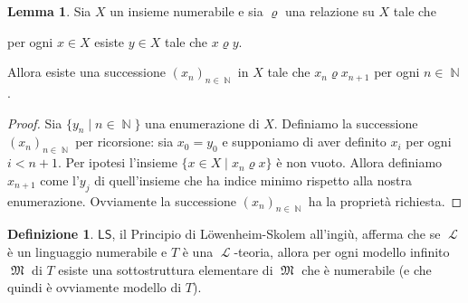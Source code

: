 \documentclass[12pt,a4paper]{report}
\theoremstyle{definition}
\newtheorem{defn}[teo]{Definizione}  %
\newtheorem{lemma}[teo]{Lemma}  %
\theoremstyle{num.custom-title}
\DeclareMathOperator{\LL}{\mathcal{L}}
\DeclareMathOperator{\N}{\mathbb{N}}
\DeclareMathOperator{\M}{\mathfrak{M}}
\newcommand{\LS}{\ensuremath{\mathsf{LS}}\xspace}
\begin{document}
\begin{lemma}\label{DC_num}
Sia $X$ un insieme numerabile e sia $\varrho$ una relazione su $X$ tale che 
\begin{center}
per ogni $x \in X$ esiste $y \in X$ tale che $x \varrho y$.
\end{center}
Allora esiste una successione $(x_n)_{n \in \N}$ in $X$ tale che $x_n \varrho x_{n+1}$ per ogni $n \in \N$.
\begin{proof}
Sia $\{y_n \mid n \in \N\}$ una enumerazione di $X$. Definiamo la successione $(x_n)_{n \in \N}$ per ricorsione: sia $x_0 = y_0$ e supponiamo di aver definito $x_i$ per ogni $i < n+1$. Per ipotesi l'insieme $\{x \in X \mid x_n \varrho x\}$ è non vuoto. Allora definiamo $x_{n+1}$ come l'$y_j$ di quell'insieme che ha indice minimo rispetto alla nostra enumerazione. Ovviamente la successione $(x_n)_{n \in \N}$ ha la proprietà richiesta.
\end{proof}
\end{lemma}

\begin{defn}
\LS, il Principio di Löwenheim-Skolem all'ingiù, afferma che se $\LL$ è un linguaggio numerabile e $T$ è una $\LL$-teoria, allora per ogni modello infinito $\M$ di $T$ esiste una sottostruttura elementare di $\M$ che è numerabile (e che quindi è ovviamente modello di $T$).
\end{defn}
\end{document}
